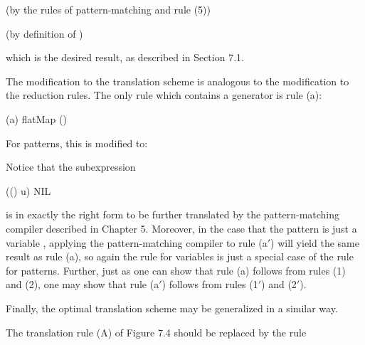 
\hfill (by the rules of pattern-matching and rule (5))

\ml{$\rightarrow$ [\,] ++ [5] ++ [\,] ++ [2]}

\hfill (by definition of \fatbar{})

\ml{$\rightarrow$ [5, 2]}

\noindent
which is the desired result, as described in Section 7.1.

The modification to the translation scheme is analogous to the modification
to the reduction rules. The only rule which contains a generator is rule (a):
\begin{mlcoded}
    (a)  \equivalent flatMap () 
\end{mlcoded}
For patterns, this is modified to:


Notice that the subexpression
\begin{mlcoded}
    (() u) \fatbar{} NIL
\end{mlcoded}
is in exactly the right form to be further translated by the pattern-matching
compiler described in Chapter 5. Moreover, in the case that the pattern  is
just a variable , applying the pattern-matching compiler to rule (a$'$) will yield
the same result as rule (a), so again the rule for variables is just a special case
of the rule for patterns. Further, just as one can show that rule (a) follows
from rules (1) and (2), one may show that rule (a$'$) follows from rules (1$'$) and
(2$'$).

Finally, the optimal translation scheme may be generalized in a similar way.

The translation rule (A) of Figure 7.4 should be replaced by the rule

